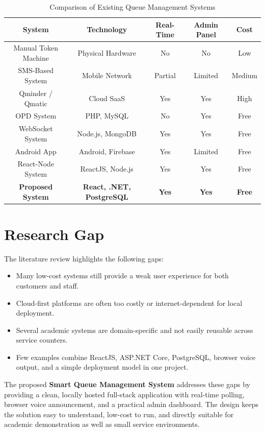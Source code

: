 \begin{table}[htbp]
    \centering
    \begin{tabular}{|c|c|c|c|c|}
        \hline
        \textbf{System} & \textbf{Technology} & \textbf{Real-Time} & \textbf{Admin Panel} & \textbf{Cost} \\
        \hline
        Manual Token Machine & Physical Hardware & No & No & Low \\
        \hline
        SMS-Based System & Mobile Network & Partial & Limited & Medium \\
        \hline
        Qminder / Qmatic & Cloud SaaS & Yes & Yes & High \\
        \hline
        OPD System \cite{garg2019} & PHP, MySQL & No & Yes & Free \\
        \hline
        WebSocket System \cite{alazzawi2020} & Node.js, MongoDB & Yes & Yes & Free \\
        \hline
        Android App \cite{sharma2021} & Android, Firebase & Yes & Limited & Free \\
        \hline
        React-Node System \cite{desai2022} & ReactJS, Node.js & Yes & Yes & Free \\
        \hline
        \textbf{Proposed System} & \textbf{React, .NET, PostgreSQL} & \textbf{Yes} & \textbf{Yes} & \textbf{Free} \\
        \hline
    \end{tabular}
    \caption{Comparison of Existing Queue Management Systems}
    \label{tab:comparison}
\end{table}

\section{Research Gap}

The literature review highlights the following gaps:

\begin{itemize}
    \item Many low-cost systems still provide a weak user experience for both customers and staff.
    \item Cloud-first platforms are often too costly or internet-dependent for local deployment.
    \item Several academic systems are domain-specific and not easily reusable across service counters.
    \item Few examples combine ReactJS, ASP.NET Core, PostgreSQL, browser voice output, and a simple deployment model in one project.
\end{itemize}

The proposed \textbf{Smart Queue Management System} addresses these gaps by providing a clean, locally hosted full-stack application with real-time polling, browser voice announcement, and a practical admin dashboard. The design keeps the solution easy to understand, low-cost to run, and directly suitable for academic demonstration as well as small service environments.
